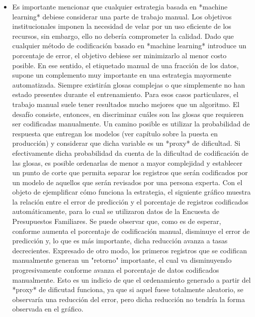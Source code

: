 \documentclass[
  12pt,
  spanish,
]{article}
\begin{document}
\begin{itemize}
  \item Es importante mencionar que cualquier estrategia basada en *machine learning* debiese considerar una parte de trabajo manual. Los objetivos institucionales imponen la necesidad de velar por un uso eficiente de los recursos, sin embargo, ello no debería comprometer la calidad. Dado que cualquier método de codificación basado en *machine learning* introduce un porcentaje de error, el objetivo debiese ser minimizarlo al menor costo posible. En ese sentido, el etiquetado manual de una fracción de los datos, supone un complemento muy importante en una estrategia mayormente automatizada. Siempre existirán glosas complejas o que simplemente no han estado presentes durante el entrenamiento. Para esos casos particulares, el trabajo manual suele tener resultados mucho mejores que un algoritmo. El desafío consiste, entonces, en discriminar cuáles son las glosas que requieren ser codificadas manualmente. Un camino posible es utilizar la probabilidad de respuesta que entregan los modelos (ver capítulo sobre la puesta en producción) y considerar que dicha variable es un *proxy* de dificultad. Si efectivamente dicha probabilidad da cuenta de la dificultad de codificación de las glosas, es posible ordenarlas de menor a mayor complejidad y establecer un punto de corte que permita separar los registros que serán codificados por un modelo de aquellos que serán revisados por una persona experta.
\newline
\newline Con el objeto de ejemplificar cómo funciona la estrategia, el siguiente gráfico muestra la relación entre el error de predicción y el porcentaje de registros codificados automáticamente, para lo cual se utilizaron datos de la Encuesta de Presupuestos Familiares. Se puede observar que, como es de esperar, conforme aumenta el porcentaje de codificación manual, disminuye el error de predicción y, lo que es más importante, dicha reducción avanza a tasas decrecientes. Expresado de otro modo, los primeros registros que se codifican manualmente generan un "retorno" importante, el cual va disminuyendo progresivamente conforme avanza el porcentaje de datos codificados manualmente. Esto es un indicio de que el ordenamiento generado a partir del *proxy* de dificutad funciona, ya que si aquel fuese totalmente aleatorio, se observaría una reducción del error, pero dicha reducción no tendría la forma observada en el gráfico.
\newline

\end{itemize}
\end{document}
